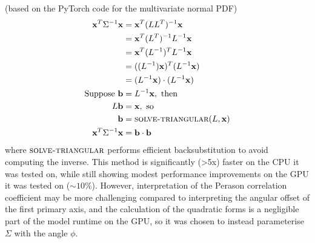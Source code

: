 \documentclass[a4paper, 12pt]{report}
\begin{document}
(based on the PyTorch code for the multivariate normal PDF)
\begin{align*}
	\mathbf{x}^T\Sigma^{-1}\mathbf{x}
	&= \mathbf{x}^T(LL^T)^{-1}\mathbf{x}\\
	&= \mathbf{x}^T(L^T)^{-1}L^{-1}\mathbf{x}\\
	&= \mathbf{x}^T(L^{-1})^{T}L^{-1}\mathbf{x}\\
	&= ((L^{-1})\mathbf{x})^T(L^{-1}\mathbf{x})\\
	&= (L^{-1}\mathbf{x})\cdot(L^{-1}\mathbf{x})\\
\textrm{Suppose }\mathbf{b}&=L^{-1}\mathbf{x}, \textrm{ then}\\
	L\mathbf{b}&=\mathbf{x}, \textrm{ so}\\
	\mathbf{b}&= \textsc{solve-triangular}(L, \mathbf{x})\\
	\mathbf{x}^T\Sigma^{-1}\mathbf{x} &= \mathbf{b}\cdot\mathbf{b}
\end{align*}
where $\textsc{solve-triangular}$ performs efficient backsubstitution to avoid computing the inverse. This method is significantly (>5x) faster on the CPU it was tested on, while still showing modest performance improvements on the GPU it was tested on ($\sim 10\%$). However, interpretation of the Perason correlation coefficient may be more challenging compared to interpreting the angular offset of the first primary axis, and the calculation of the quadratic forms is a negligible part of the model runtime on the GPU, so it was chosen to instead parameterise $\Sigma$ with the angle $\phi$.
\end{document}
